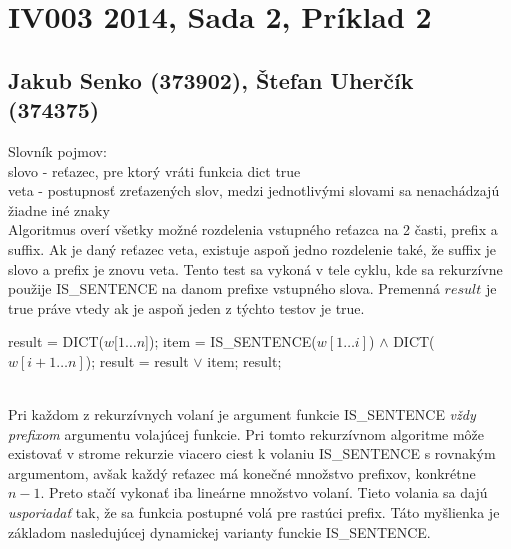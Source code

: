 \documentclass[paper=a4, fontsize=11pt]{scrartcl} %
\numberwithin{equation}{section} %
\numberwithin{figure}{section} %
\numberwithin{table}{section} %
\begin{document}
\pagebreak


\section*{IV003 2014, Sada 2, Príklad 2}
\subsection*{Jakub Senko (373902), Štefan Uherčík (374375)}

Slovník pojmov: \ \\
slovo - reťazec, pre ktorý vráti funkcia dict true \ \\
veta - postupnosť zreťazených slov, medzi jednotlivými slovami sa nenachádzajú žiadne iné znaky \ \\

Algoritmus overí všetky možné rozdelenia vstupného reťazca na 2 časti, prefix a suffix.
Ak je daný reťazec veta, existuje aspoň jedno rozdelenie také, že suffix je slovo a prefix je znovu veta.
Tento test sa vykoná v tele cyklu, kde sa rekurzívne použije IS\_SENTENCE na danom prefixe vstupného slova.
Premenná $result$ je true práve vtedy ak je aspoň jeden z týchto testov je true. \ \\

\begin{algorithmic}[1]
        \State result = DICT($w[1 \dots n$]);
        	\State item = IS\_SENTENCE($w[1 \dots i]$) $\wedge$ DICT($w[i + 1 \dots n]$);
		\State result = result $\vee$ item;
        \EndFor
        \State \Return result;
    \EndFunction
\end{algorithmic}
\ \\

Pri každom z rekurzívnych volaní je argument funkcie IS\_SENTENCE {\em vždy prefixom} argumentu volajúcej funkcie.
Pri tomto rekurzívnom algoritme môže existovať v strome rekurzie viacero ciest k volaniu IS\_SENTENCE s rovnakým argumentom, avšak každý reťazec má konečné množstvo prefixov, konkrétne $n - 1$.
Preto stačí vykonať iba lineárne množstvo volaní.
Tieto volania sa dajú {\em usporiadať} tak, že sa funkcia postupné volá pre rastúci prefix. 
Táto myšlienka je základom nasledujúcej dynamickej varianty funckie IS\_SENTENCE.\\
\end{document}
